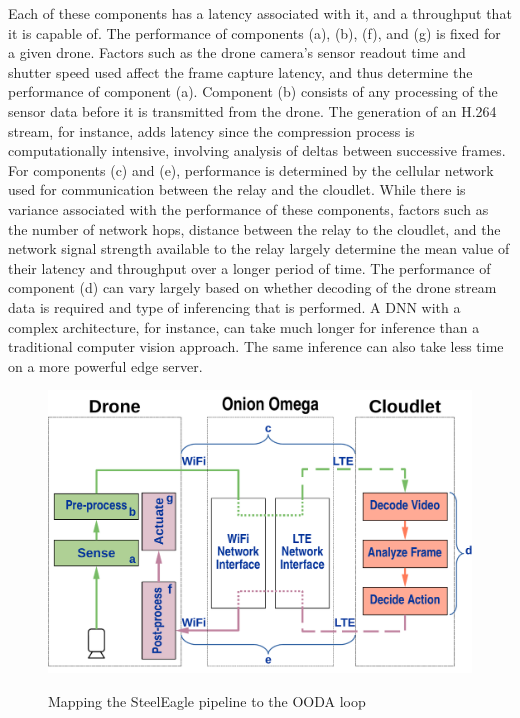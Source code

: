 Each of these components has a latency associated with it, and a throughput
that it is capable of. The performance of components (a), (b), (f), and (g) is
fixed for a given drone. Factors such as the drone camera's sensor readout time
and shutter speed used affect the frame capture latency, and thus determine the
performance of component (a). Component (b) consists of any processing of the
sensor data before it is transmitted from the drone. The generation of an H.264
stream, for instance, adds latency since the compression process is
computationally intensive, involving analysis of deltas between successive
frames. For components (c) and (e), performance is determined by the cellular
network used for communication between the relay and the cloudlet. While there
is variance associated with the performance of these components, factors such
as the number of network hops, distance between the relay to the cloudlet, and
the network signal strength available to the relay largely determine the mean
value of their latency and throughput over a longer period of time. The
performance of component (d) can vary largely based on whether decoding of the
drone stream data is required and type of inferencing that is performed. A DNN
with a complex architecture, for instance, can take much longer for inference
than a traditional computer vision approach. The same inference can also take
less time on a more powerful edge server.

\begin{figure}[htbp]
\centering
\includegraphics[width = .6\textwidth]{figs/fig-ooda-loop.pdf}\\
\caption{Mapping the SteelEagle pipeline to the OODA loop}
\label{fig:ooda-mapping}
\end{figure}

